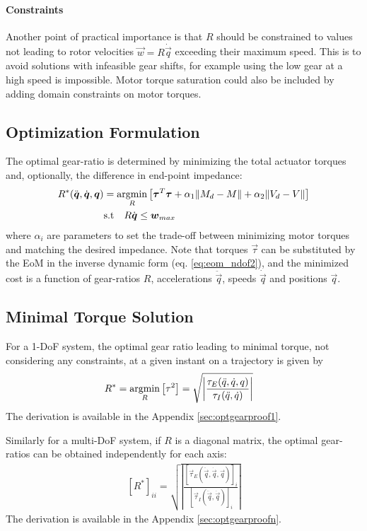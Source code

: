 \paragraph{Constraints}
Another point of practical importance is that $R$ should be constrained to values not leading to rotor velocities $\vec{w}=R \dot{\vec{q}}$ exceeding their maximum speed. This is to avoid solutions with infeasible gear shifts, for example using the low gear at a high speed is impossible. Motor torque saturation could also be included by adding domain constraints on motor torques.

\subsection{Optimization Formulation}
The optimal gear-ratio is determined by minimizing the total actuator torques and, optionally, the difference in end-point impedance:
%
\begin{align}
	R^{*}(\ddot{\vec{q}},\dot{\vec{q}},\vec{q}) &= \operatornamewithlimits{argmin}\limits_{R} \left[ \vec{\tau}^T \vec{\tau} + \alpha_1 \| M_{d} - M \| + \alpha_2 \| V_{d} - V \| \right]  \\
	& \text{s.t}  \quad R \dot{\vec{q}} \leq \vec{w}_{max} 
\label{eq:rmin_general}
\end{align}
%
where $\alpha_i$ are parameters to set the trade-off between minimizing motor torques and matching the desired impedance. Note that torques $\vec{\tau}$ can be substituted by the EoM in the inverse dynamic form (eq. \eqref{eq:eom_ndof2}), and the minimized cost is a function of gear-ratios $R$, accelerations $\ddot{\vec{q}}$, speeds $\dot{\vec{q}}$ and positions $\vec{q}$. 
%

\subsection{Minimal Torque Solution}

For a 1-DoF system, the optimal gear ratio leading to minimal torque, not considering any constraints, at a given instant on a trajectory is given by
%
\begin{align}
	R^{*} &= \operatornamewithlimits{argmin}\limits_{R} \left[ \tau^2 \right] = \sqrt{ \left | \frac{\tau_{E}(\ddot{q},\dot{q},q)}{\tau_{I}(\ddot{q},\dot{q})} \right |   } 
\label{eq:aaa}
\end{align}
%
The derivation is available in the Appendix \ref{sec:optgearproof1}.

Similarly for a multi-DoF system, if $R$ is a diagonal matrix, the optimal gear-ratios can be obtained independently for each axis:
%
\begin{align}
	[R^*]_{ii} = \sqrt{ \left | \frac{ [\vec{\tau}_{E}(\ddot{\vec{q}},\dot{\vec{q}},\vec{q})]_i }{ [\vec{\tau}_{I}(\ddot{\vec{q}},\dot{\vec{q}})]_i } \right | }
 \label{eq:rmin2}
\end{align}
%
The derivation is available in the Appendix \ref{sec:optgearproofn}.

